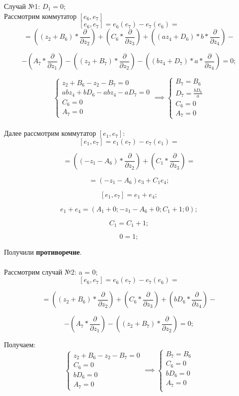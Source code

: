 \documentclass[12pt]{article}
\begin{document}
Случай №1: $D_1 = 0$; \\
Рассмотрим коммутатор $[e_6, e_7]$
\[
[e_6, e_7] = e_6(e_7) - e_7(e_6) = 
\]
\[
= \left((z_2 + B_6) * \frac{\partial}{\partial z_2}\right)
+ \left(C_6 * \frac{\partial}{\partial z_3}\right)
+ \left((az_4 + D_6) * b * \frac{\partial}{\partial z_4}\right) - 
\]

\[
- \left(A_7 * \frac{\partial}{\partial z_1}\right)
- \left((z_2 + B_7) * \frac{\partial}{\partial z_2}\right)
- \left((bz_4 + D_7) * a * \frac{\partial}{\partial z_4}\right) = 0;
\]

\[
\begin{cases}
z_2 + B_6 - z_2 - B_7 = 0 \\
abz_4 + bD_6 - abz_4 - aD_7 = 0 \\
C_6 = 0 \\
A_7 = 0
\end{cases}
\implies
\begin{cases}
B_7 = B_6 \\
D_7 = \frac{bD_6}{a} \\
C_6 = 0 \\
A_7 = 0
\end{cases}
\]\\

Далее рассмотрим коммутатор $[e_1, e_7]$: 
\[
[e_1, e_7] = e_1(e_7) - e_7(e_1) = 
\]

\[
= \left((-z_1 - A_6) * \frac{\partial}{\partial z_2}\right)
+ \left(C_1 * \frac{\partial}{\partial z_3}\right) =
\]

\[
= (-z_1 - A_6)e_3 + C_1e_4;
\]

\[
[e_1, e_7] = e_1 + e_4;
\]

\[
e_1 + e_4 = \left(A_1 + 0; -z_1 - A_6 + 0; C_1 + 1; 0 \right);
\]

\[
C_1 = C_1 + 1;
\]

\[
0 = 1;
\]

Получили \textbf{противоречие}.\\\\
Рассмотрим случай №2: a = 0;
\[
[e_6, e_7] = e_6(e_7) - e_7(e_6) = 
\]

\[
= \left( (z_2 + B_6) * \frac{\partial}{\partial z_2} \right)
+ \left( C_6 * \frac{\partial}{\partial z_3} \right)
+ \left( bD_6 * \frac{\partial}{\partial z_4} \right) - 
\]

\[
- \left( A_7 * \frac{\partial}{\partial z_1} \right)
- \left( (z_2 + B_7) * \frac{\partial}{\partial z_2} \right) = 0;
\]

Получаем: \\
\[
\begin{cases}
z_2 + B_6 - z_2 - B_7 = 0 \\
C_6 = 0 \\
bD_6 = 0 \\
A_7 = 0
\end{cases}
\implies
\begin{cases}
B_7 = B_6 \\
C_6 = 0 \\
bD_6 = 0 \\
A_7 = 0 \\
\end{cases}
\]\\
\end{document}
